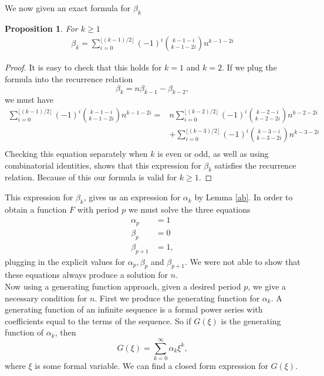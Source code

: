 \documentclass[12pt]{article}
\newtheorem{proposition}{Proposition}
\begin{document}
We now given an exact formula for $\beta_k$ 
\begin{proposition} 
For $k \geq 1$
\begin{align*}
\beta_k =\sum_{i = 0}^{\lfloor (k-1)/2 \rfloor} (-1)^i\binom{k-1-i}{k-1-2i}n^{k-1-2i}
\end{align*}
\end{proposition}
\begin{proof}
It is easy to check that this holds for $k = 1$ and $k = 2$.  If we plug the formula into the recurrence relation
\begin{equation*}
\beta_k = n\beta_{k-1} - \beta_{k-2},
\end{equation*}
we must have 
\begin{align*}
\sum_{i = 0}^{\lfloor (k-1)/2 \rfloor} (-1)^i\binom{k-1-i}{k-1-2i}n^{k-1-2i} = & n \sum_{i = 0}^{\lfloor (k-2)/2 \rfloor} (-1)^i\binom{k-2-i}{k-2-2i}n^{k-2-2i} \\
& +\sum_{i = 0}^{\lfloor (k-3)/2 \rfloor} (-1)^i\binom{k-3-i}{k-3-2i}n^{k-3-2i}\\
\end{align*}
Checking this equation separately when $k$ is even or odd, as well as using combinatorial identities, shows that this expression for $\beta_k$ satisfies the recurrence relation. Because of this our formula is valid for $k \geq 1$.
\end{proof}

This expression for $\beta_k$, gives us an expression for $\alpha_k$ by Lemma \ref{ab}. In order to obtain a function $F$ with period $p$ we must solve the three equations
\begin{align*}
\alpha_p &=1 \\
\beta_p &=0\\ 
\beta_{p+1} &= 1,
\end{align*}
plugging in the explicit values for $\alpha_p, \beta_p$ and $\beta_{p+1}$. We were not able to show that these equations always produce a solution for $n$.
\\ 


Now using a generating function approach, given a desired period $p$, we give a necessary condition for $n$. 
First we produce the generating function for $\alpha_k$. A generating function of an infinite sequence is a formal power series with coefficients equal to the terms of the sequence.  So if $G(\xi)$ is the generating function of $\alpha_k$, then 
\begin{equation*}
G(\xi) = \sum_{k=0}^{\infty} \alpha_k \xi^k,
\end{equation*}
where $\xi$ is some formal variable. We can find a closed form expression for $G(\xi)$.
\end{document}
